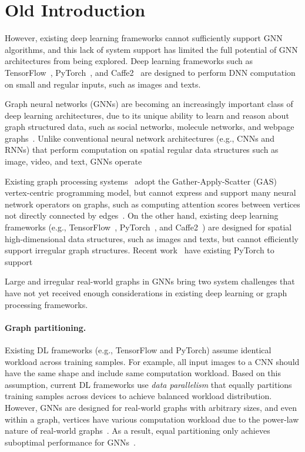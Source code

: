 \section{Old Introduction}

However, existing deep learning frameworks cannot sufficiently support GNN algorithms, and this lack of system support has limited the full potential of GNN architectures from being explored.
Deep learning frameworks such as TensorFlow~\cite{TensorFlow}, PyTorch~\cite{PyTorch}, and Caffe2~\cite{Caffe2} are designed to perform DNN computation on small and regular inputs, such as images and texts.

Graph neural networks (GNNs) are becoming an increasingly important class of deep learning architectures, due to its unique ability to learn and reason about graph structured data, such as social networks, molecule networks, and webpage graphs~\cite{GCN, GraphSAGE, DiffPool, GIN}.
Unlike conventional neural network architectures (e.g., CNNs and RNNs) that perform computation on spatial regular data structures such as image, video, and text, GNNs operate 


Existing graph processing systems~\cite{Pregel, Giraph, GraphX, Lux} adopt the
Gather-Apply-Scatter (GAS)~\cite{PowerGraph} vertex-centric programming model,
but cannot express and support many neural network operators on graphs, such as computing attention scores between vertices not directly connected by edges~\cite{GraphAttention}.
%
On the other hand, existing deep learning frameworks (e.g., TensorFlow~\cite{TensorFlow}, PyTorch~\cite{PyTorch}, and Caffe2~\cite{Caffe2}) are designed for spatial high-dimensional data structures, such as images and texts, but cannot efficiently support irregular graph structures.
%
Recent work~\cite{DGL, PyG} have existing PyTorch to support 

Large and irregular real-world graphs in GNNs bring two system challenges that have not yet received enough considerations in existing deep learning or graph processing frameworks.

\paragraph{Graph partitioning.}
Existing DL frameworks (e.g., TensorFlow and PyTorch) assume identical workload across training samples.
For example, all input images to a CNN should have the same shape and include same computation workload.
Based on this assumption, current DL frameworks use {\em data parallelism} that equally partitions training samples across devices to achieve balanced workload distribution.
However, GNNs are designed for real-world graphs with arbitrary sizes, and even within a graph, vertices have various computation workload due to the power-law nature of real-world graphs~\cite{PowerGraph}.
As a result, equal partitioning only achieves suboptimal performance for GNNs~\cite{Lux}.
%

